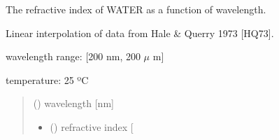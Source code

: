 \documentclass[letterpaper,10pt,english]{sphinxmanual}
\begin{document}

\begin{fulllineitems}
\label{\detokenize{05_refractive_index:skinoptics.refractive_index.n_wat_Hale}}
\pysigstartsignatures
{}
\pysigstopsignatures
\begin{DUlineblock}{0em}
\item[] The refractive index of WATER as a function of wavelength.
\item[] Linear interpolation of data from Hale \& Querry 1973 {[}HQ73{]}.
\end{DUlineblock}

\begin{DUlineblock}{0em}
\item[] wavelength range: {[}200 nm, 200 \(\mu\) m{]}
\item[] temperature: 25 ºC
\end{DUlineblock}
\begin{quote}\begin{description}
\sphinxAtStartPar
{} () \textendash{} wavelength {[}nm{]}

\sphinxAtStartPar
\begin{itemize}
\item {} 
\sphinxAtStartPar
{} () \textendash{} refractive index {[}\sphinxhyphen{}{]}

\end{itemize}


\end{description}\end{quote}

\end{fulllineitems}

\end{document}

